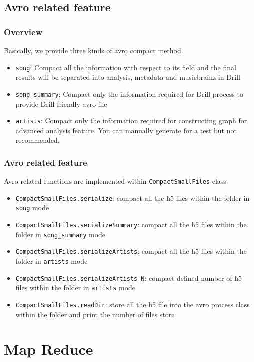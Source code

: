 \documentclass{beamer}
\begin{document}
\subsection{Avro related feature}
\begin{frame}
	\frametitle{Overview}
	Basically, we provide three kinds of avro compact method.
	\begin{itemize}
		\item \texttt{song}: Compact all the information with respect to its field and the final results will be separated into analysis, metadata and musicbrainz in Drill
		\item \texttt{song_summary}: Compact only the information required for Drill process to provide Drill-friendly avro file
		\item \texttt{artists}: Compact only the information required for constructing graph for advanced analysis feature. You can manually generate for a test but not recommended.
	\end{itemize}
	
\end{frame}
\begin{frame}
	\frametitle{Avro related feature}
	Avro related functions are implemented within \texttt{CompactSmallFiles} class
	\begin{itemize}
		\item \texttt{CompactSmallFiles.serialize}: compact all the h5 files within the folder in \texttt{song} mode
		\item \texttt{CompactSmallFiles.serializeSummary}: compact all the h5 files within the folder in \texttt{song_summary} mode
		\item \texttt{CompactSmallFiles.serializeArtists}: compact all the h5 files within the folder in \texttt{artists} mode
		\item \texttt{CompactSmallFiles.serializeArtists_N}: compact defined number of h5 files within the folder in \texttt{artists} mode
		\item \texttt{CompactSmallFiles.readDir}: store all the h5 file into the avro process class within the folder and print the number of files store
	\end{itemize}
	
\end{frame}


\section{Map Reduce}
\begin{frame}
\end{frame}
\end{document}

